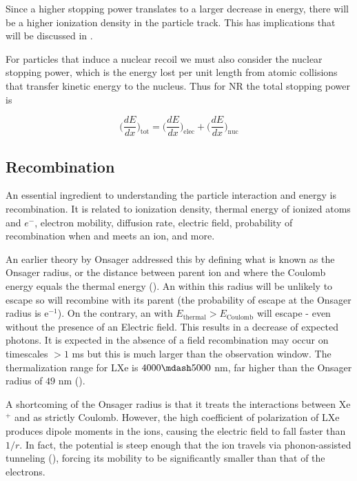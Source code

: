 Since a higher stopping power translates to a larger decrease in energy, there will be a higher ionization density in the particle
track.  This has implications that will be discussed in \secref{}.

For particles that induce a nuclear recoil we must also consider the nuclear stopping power, which is the energy lost per unit length from
atomic collisions that transfer kinetic energy to the nucleus.  Thus for NR the total stopping power is

\begin{equation}
\bigg( \frac{dE}{dx} \bigg)_{\mathrm{tot}} = \bigg( \frac{dE}{dx} \bigg)_{\mathrm{elec}} + \bigg( \frac{dE}{dx} \bigg)_{\mathrm{nuc}}
\end{equation}



\subsection{Recombination}
\label{subsec:recombination}
An essential ingredient to understanding the particle interaction and energy is recombination.  It is related to ionization density,
thermal energy of ionized atoms and $e^{-}$, electron mobility, diffusion rate, electric field, probability of recombination when
and \electron meets an ion, and more.

An earlier theory by Onsager addressed this by defining what is known
as the Onsager radius, or the distance between parent
ion and \electron where the Coulomb energy equals the \electron thermal energy ().  An \electron within this
radius will be unlikely to
escape so will recombine with its parent (the probability of escape at the Onsager radius is e$^{-1}$).  On the contrary, an \electron
with $E_{\mathrm{thermal}} > E_{\mathrm{Coulomb}}$ will escape - even without the presence of an Electric field.  This results in a decrease of expected
photons.  It is expected in the absence of a field recombination may occur on timescales $> 1$ ms but this is much larger than the
observation window.  The thermalization range for LXe is $4000 \mdash 5000$ nm, far higher than the Onsager radius of $49$ nm
().

A shortcoming of the Onsager radius is that it treats the interactions between Xe$^{+}$ and \electron as strictly Coulomb.  However,
the high coefficient of polarization of LXe produces dipole moments in the ions, causing the electric field to fall faster than
$1/r$.  In fact, the potential is steep enough that the ion travels via phonon-assisted tunneling (), forcing its
mobility to be significantly smaller than that of the electrons.

